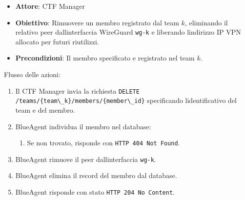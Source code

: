 \begin{itemize}
\tightlist
\item
  \textbf{Attore}: CTF Manager
\item
  \textbf{Obiettivo}: Rimuovere un membro registrato dal team \(k\),
  eliminando il relativo peer dall\textquotesingle interfaccia WireGuard
  \passthrough{\lstinline!wg-k!} e liberando l\textquotesingle indirizzo
  IP VPN allocato per futuri riutilizzi.
\item
  \textbf{Precondizioni}: Il membro specificato e\textquotesingle{}
  registrato nel team \(k\).
\end{itemize}

Flusso delle azioni:

\begin{enumerate}
\def\labelenumi{\arabic{enumi}.}
\tightlist
\item
  Il CTF Manager invia la richiesta
  \passthrough{\lstinline!DELETE /teams/\{team\_k\}/members/\{member\_id\}!}
  specificando l\textquotesingle identificativo del team e del membro.
\item
  BlueAgent individua il membro nel database:

  \begin{enumerate}
  \def\labelenumii{\arabic{enumii}.}
  \tightlist
  \item
    Se non trovato, risponde con
    \passthrough{\lstinline!HTTP 404 Not Found!}.
  \end{enumerate}
\item
  BlueAgent rimuove il peer dall\textquotesingle interfaccia
  \passthrough{\lstinline!wg-k!}.
\item
  BlueAgent elimina il record del membro dal database.
\item
  BlueAgent risponde con stato
  \passthrough{\lstinline!HTTP 204 No Content!}.
\end{enumerate}
